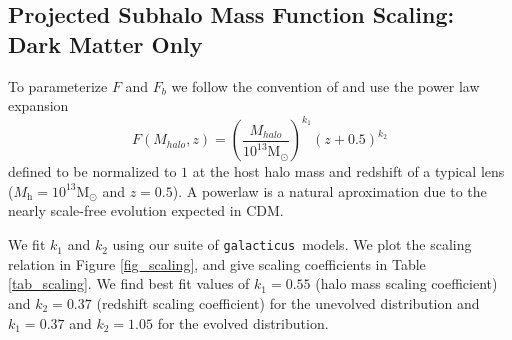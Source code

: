 \documentclass[%
 reprint,
 amsmath,
 amssymb,
 aps,
prd,
twocolumn,
superscriptaddress,
preprintnumbers,
floatfix,
nofootinbib
]{revtex4-2}
\def\gal{{\tt galacticus}~}
\newcommand{\reffig}[1]{Figure \ref{#1}}
\newcommand{\reftable}[1]{Table \ref{#1}}
\begin{document}
\subsection{Projected Subhalo Mass Function Scaling: Dark Matter Only}\label{sec_scaling}

To parameterize $F$ and $F_b$ we follow the convention of \citet{gilman2019probing} and use the power law expansion \begin{equation}\label{eq_dnda_scaling}
    F(M_{halo},z) = \left(\frac{M_{halo}}{10^{13}\mathrm{M}_{\odot}}\right)^{k_1}\left(z+0.5\right)^{k_2}
\end{equation}
defined to be normalized to $1$ at the host halo mass and redshift of a typical lens ($M_{\mathrm{h}} = 10^{13} \mathrm{M}_\odot$ and $z=0.5$).
A powerlaw is a natural aproximation due to the nearly scale-free evolution expected in CDM.

We fit $k_1$ and $k_2$ using our suite of \gal models.
We plot the scaling relation in \reffig{fig_scaling}, and give scaling coefficients in \reftable{tab_scaling}.
We find best fit values of $k_1 = 0.55$ (halo mass scaling coefficient) and $k_2 = 0.37$ (redshift scaling coefficient) for the unevolved distribution and $k_1 = 0.37$ and $k_2 = 1.05$ for the evolved distribution.
\end{document}
